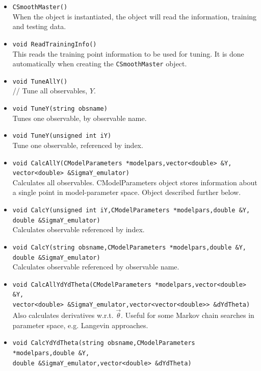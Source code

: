 \documentclass[UserManual.tex]{subfiles}
\begin{document}
\begin{sloppypar}
\begin{itemize}\itemsep=0pt
\item {\tt CSmoothMaster()}\\
When the object is instantiated, the object will read the information, training and testing data.
\item {\tt void ReadTrainingInfo()}\\
This reads the training point information to be used for tuning. It is done automatically when creating the {\tt CSmoothMaster} object.
\item {\tt void TuneAllY()}\\ //
Tune all observables, $Y$.
\item {\tt void TuneY(string obsname)}\\
Tunes one observable, by observable name.
\item {\tt void TuneY(unsigned int iY)}\\
Tune one observable, referenced by index.
\item {\tt void CalcAllY(CModelParameters *modelpars,vector<double> \&Y,\\vector<double> \&SigmaY\_emulator)}\\
Calculates all observables. CModelParameters object stores information about a single point in model-parameter space. Object described further below.
\item {\tt void CalcY(unsigned int iY,CModelParameters *modelpars,double \&Y,\\double \&SigmaY\_emulator)}\\
Calculates observable referenced by index.
\item {\tt void CalcY(string obsname,CModelParameters *modelpars,double \&Y,\\double \&SigmaY\_emulator)}\\
Calculates observable referenced by observable name.
\item {\tt void CalcAllYdYdTheta(CModelParameters *modelpars,vector<double> \&Y,\\
vector<double> \&SigmaY\_emulator,vector<vector<double>> \&dYdTheta)}\\
Also calculates derivatives w.r.t. $\vec{\theta}$. Useful for some Markov chain searches in parameter space, e.g. Langevin approaches.
\item {\tt void CalcYdYdTheta(string obsname,CModelParameters *modelpars,double \&Y,\\double \&SigmaY\_emulator,vector<double> \&dYdTheta)}\\

\end{itemize}
\end{sloppypar}
\end{document}
